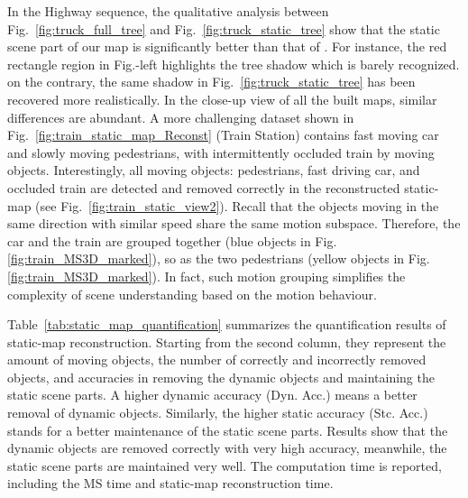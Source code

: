 \documentclass[10pt,twocolumn,letterpaper]{article}  %
\begin{document}
In the Highway sequence, the qualitative analysis between Fig.~\ref{fig:truck_full_tree} and Fig.~\ref{fig:truck_static_tree} show that the static scene part of our map is significantly better than that of \cite{c31}. For instance, the red rectangle region in Fig.-left highlights the tree shadow which is barely recognized. on the contrary, the same shadow in Fig.~\ref{fig:truck_static_tree} has been recovered more realistically. In the close-up view of all the built maps, similar differences are abundant. A more challenging dataset shown in Fig.~\ref{fig:train_static_map_Reconst} (Train Station) contains fast moving car and slowly moving pedestrians, with intermittently occluded train by moving objects. Interestingly, all moving objects: pedestrians, fast driving car, and occluded train are detected and removed correctly in the reconstructed static-map (see Fig.~\ref{fig:train_static_view2}). Recall that the objects moving in the same direction with similar speed share the same motion subspace. Therefore, the car and the train are grouped together (blue objects in Fig.\ref{fig:train_MS3D_marked}), so as the two pedestrians (yellow objects in Fig.\ref{fig:train_MS3D_marked}). In fact, such motion grouping simplifies the complexity of scene understanding based on the motion behaviour. 
 
 Table~\ref{tab:static_map_quantification} summarizes the  quantification results of static-map reconstruction. Starting from the second column, they represent the amount of moving objects, the number of correctly and incorrectly removed objects, and accuracies in removing the dynamic objects and maintaining the static scene parts. A higher dynamic accuracy (Dyn. Acc.) means  a better removal of dynamic objects. Similarly, the higher static accuracy (Stc. Acc.) stands for a better maintenance of the static scene parts. Results show that the dynamic objects are removed correctly with very high accuracy, meanwhile, the static scene parts are maintained very well. The computation time is reported, including the MS time and static-map reconstruction time. 
 
\end{document}
